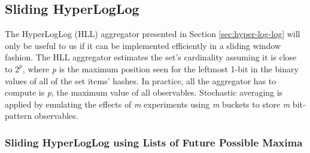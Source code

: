 

\subsection{Sliding HyperLogLog}

The HyperLogLog (HLL) aggregator presented in Section \ref{sec:hyper-log-log} will only be useful to us if it can be implemented efficiently in a sliding window fashion. The HLL aggregator estimates the set's cardinality assuming it is close to $2^\textit{p}$, where \textit{p} is the maximum position seen for the leftmost 1-bit in the binary values of all of the set items' hashes. In practice, all the aggregator has to compute is \textit{p}, the maximum value of all observables. Stochastic averaging is applied by emulating the effects of \textit{m} experiments using \textit{m} buckets to store \textit{m} bit-pattern observables. 


\subsubsection{Sliding HyperLogLog using Lists of Future Possible Maxima} \label{sec:hll-lfpm}

